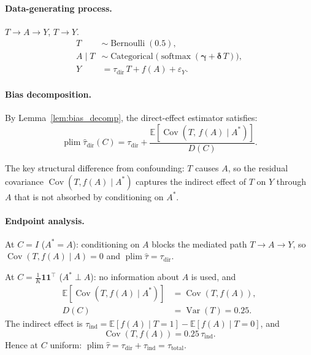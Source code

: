 \paragraph{Data-generating process.}
$T\to A\to Y$, $T\to Y$.
\begin{align*}
  T &\sim \operatorname{Bernoulli}(0.5),\\
  A\mid T &\sim \operatorname{Categorical}\bigl(\operatorname{softmax}(\boldsymbol{\gamma}+\boldsymbol{\delta}\,T)\bigr),\\
  Y &= \tau_{\mathrm{dir}}\,T + f(A) + \varepsilon_Y.
\end{align*}

\paragraph{Bias decomposition.}
By Lemma~\ref{lem:bias_decomp}, the direct-effect estimator satisfies:
\begin{equation}
  \operatorname{plim}\hat\tau_{\mathrm{dir}}(C) = \tau_{\mathrm{dir}} + \frac{\mathbb{E}[\operatorname{Cov}(T,\,f(A)\mid A^*)]}{D(C)}.
  \label{eq:med_bias}
\end{equation}

The key structural difference from confounding: $T$ causes $A$, so the residual covariance $\operatorname{Cov}(T,f(A)\mid A^*)$ captures the indirect effect of $T$ on $Y$ through $A$ that is not absorbed by conditioning on $A^*$.

\paragraph{Endpoint analysis.}

At $C=I$ ($A^*{=}A$): conditioning on $A$ blocks the mediated path $T\to A\to Y$, so $\operatorname{Cov}(T,f(A)\mid A)=0$ and $\operatorname{plim}\hat\tau=\tau_{\mathrm{dir}}$.

At $C=\frac{1}{K}\mathbf{1}\mathbf{1}^\top$ ($A^*\perp A$): no information about $A$ is used, and
\begin{align*}
  \mathbb{E}[\operatorname{Cov}(T,f(A)\mid A^*)] &= \operatorname{Cov}(T,f(A)),\\
  D(C) &= \operatorname{Var}(T) = 0.25.
\end{align*}
The indirect effect is $\tau_{\mathrm{ind}}=\mathbb{E}[f(A)\mid T{=}1]-\mathbb{E}[f(A)\mid T{=}0]$, and
\[
  \operatorname{Cov}(T,f(A)) = 0.25\,\tau_{\mathrm{ind}}.
\]
Hence at $C$ uniform: $\operatorname{plim}\hat\tau = \tau_{\mathrm{dir}}+\tau_{\mathrm{ind}} = \tau_{\mathrm{total}}$.

